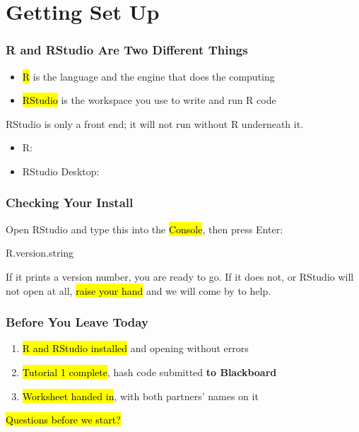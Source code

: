 \documentclass[slidestop,compress,mathserif]{beamer}
\begin{document}
\section{Getting Set Up}

\begin{frame}
	\frametitle{R and RStudio Are Two Different Things}
	\begin{itemize}
		\item \hl{R} is the language and the engine that does the computing
		\item \hl{RStudio} is the workspace you use to write and run R code
	\end{itemize}
	\vfill
	 RStudio is only a front end; it will not run without R underneath it.
	\vfill
	\begin{itemize}
		\item R: 
		\item RStudio Desktop: 
	\end{itemize}
\end{frame}

\begin{frame}[fragile]
	\frametitle{Checking Your Install}
	Open RStudio and type this into the \hl{Console}, then press Enter:
	\vfill
	\begin{semiverbatim}
	R.version.string
	\end{semiverbatim}
	\vfill
	If it prints a version number, you are ready to go.
	\vfill
	If it does not, or RStudio will not open at all, \hl{raise your hand} and we will come by to help.
\end{frame}

\begin{frame}
	\frametitle{Before You Leave Today}
	\begin{enumerate}
		\item \hl{R and RStudio installed} and opening without errors
		\item \hl{Tutorial 1 complete}, hash code submitted \textbf{to Blackboard}
		\item \hl{Worksheet handed in}, with both partners' names on it
	\end{enumerate}
	\vfill
	\vfill
	\begin{center}
		\hl{Questions before we start?}
	\end{center}
\end{frame}
\end{document}
